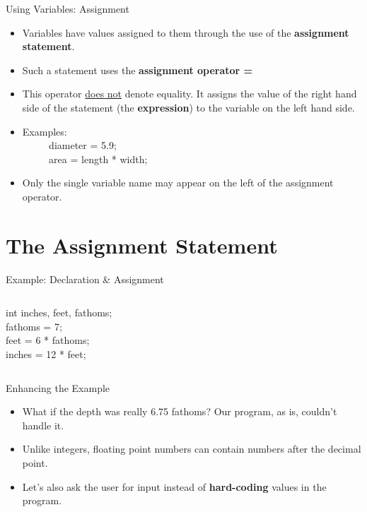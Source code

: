 \documentclass[graphics]{beamer}
\begin{document}
\begin{frame}{Using Variables: Assignment}
    \begin{itemize}
        \item Variables have values assigned to them through the use of the \textbf{assignment statement}.
        \item Such a statement uses the \textbf{assignment operator =}
        \item This operator \underline{does not} denote equality. It assigns the value of the right hand side of the statement (the \textbf{expression}) to the variable on the left hand side.
        \item Examples: \\
        ~~ ~~ diameter = 5.9; \\
        ~~ ~~ area = length * width;
        \item Only the single variable name may appear on the left of the assignment operator.
    \end{itemize}
\end{frame}

\section*{The Assignment Statement}
\begin{frame}[fragile]{Example: Declaration \& Assignment}
    \begin{columns}
            int inches, feet, fathoms;
             {
                ~~ \\
                fathoms = 7; \\
                feet = 6 * fathoms; \\
                inches = 12 * feet; \\
            }
             {
                
            }
             {
                
            }
    \end{columns}
\end{frame}

\begin{frame}{Enhancing the Example}
    \begin{itemize}
        \item What if the depth was really 6.75 fathoms? Our program, as is, couldn't handle it.
        \item Unlike integers, floating point numbers can contain numbers after the decimal point.
        \item Let's also ask the user for input instead of \textbf{hard-coding} values in the program.
    \end{itemize}
\end{frame}
\end{document}
